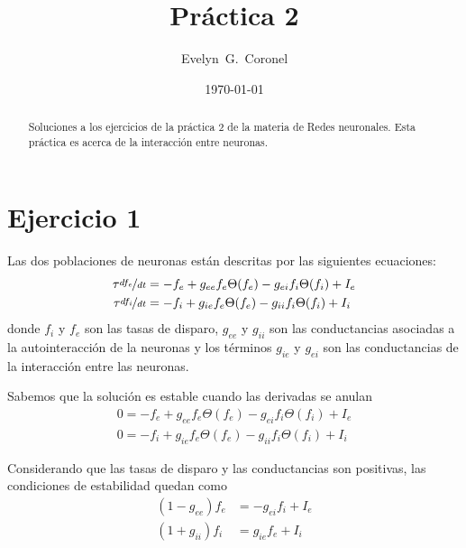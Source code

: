 



\title{Práctica 2}
\author{Evelyn~G.~Coronel}


\date[]{\lowercase{\today}} %

\begin{abstract}
Soluciones a los ejercicios de la práctica 2 de la materia de Redes neuronales. Esta práctica es acerca de la interacción entre neuronas.
\end{abstract} 
\maketitle
%


\section{Ejercicio 1}

Las dos poblaciones de neuronas están descritas por las siguientes ecuaciones:
\begin{align}
    \tau \nicefrac{df_e}{dt} &= -f_e + g_{ee} f_e\Theta(f_e) - g_{ei}f_i\Theta(f_i) + I_e\\
    \tau \nicefrac{df_i}{dt} &= -f_i + g_{ie} f_e\Theta(f_e) - g_{ii}f_i\Theta(f_i) + I_i
\end{align}
donde $f_i$ y $f_e$ son las tasas de disparo, $g_{ee}$ y $g_{ii}$ son las conductancias asociadas a la autointeracción de la neuronas y los términos $g_{ie}$ y $g_{ei}$ son las conductancias de la interacción entre las neuronas.

Sabemos que la solución es estable cuando las derivadas se anulan
\begin{align}
    0= -f_e + g_{ee} f_e\Theta(f_e) - g_{ei}f_i\Theta(f_i) + I_e\\
    0= -f_i + g_{ie} f_e\Theta(f_e) - g_{ii}f_i\Theta(f_i) + I_i
\end{align}

Considerando que las tasas de disparo y las conductancias son positivas,  las condiciones de estabilidad quedan como
\begin{align}
     (1 -g_{ee}) f_e &= -g_{ei}f_i + I_e \label{fe}\\
    (1 + g_{ii}) f_i &=  g_{ie} f_e  + I_i
\end{align}

